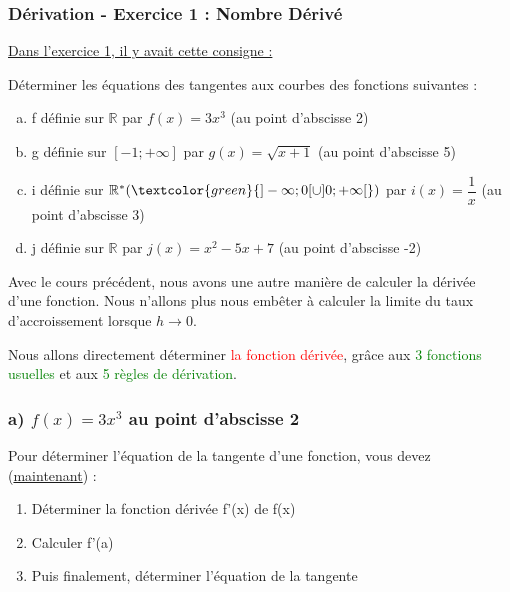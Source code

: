 \documentclass[t]{beamer}
\begin{document}
	\begin{frame}[label=pagebanale]
		\frametitle{Dérivation - Exercice 1 : Nombre Dérivé}
		\pause
		\underline{Dans l'exercice 1, il y avait cette consigne :}

		\pause
		Déterminer les équations des tangentes aux courbes des fonctions suivantes :
		\pause
		\begin{enumerate}[a)]
			\item<+-> f définie sur $\mathbb{R}$ par $f(x) = 3x^3$ (au point d'abscisse 2)
			\item<+-> g définie sur $[-1;+\infty ]$ par $g(x) = \sqrt{x+1}$ (au point d'abscisse 5)
			\item<+-> i définie sur $\mathbb{R}^* (\textcolor{green}{]-\infty;0[\cup]0;+\infty[})$ par $i(x) = \dfrac{1}{x}$ (au point d'abscisse 3)
			\item<+-> j définie sur $\mathbb{R}$ par $j(x) = x^2 - 5x +7$ (au point d'abscisse -2)
		\end{enumerate}
		\pause
		Avec le cours précédent, \pause nous avons une autre manière de calculer la dérivée d'une fonction. \pause Nous n'allons plus nous embêter à calculer la limite du taux d'accroissement lorsque $h \rightarrow 0$.

		\pause Nous allons directement déterminer \textcolor{red}{la fonction dérivée}, \pause grâce aux \textcolor{green}{3 fonctions usuelles} \pause et aux \textcolor{green}{5 règles de dérivation}. 
	\end{frame}

	\begin{frame}
		\frametitle{a) $f(x) = 3x^3$ au point d'abscisse 2}
		\pause
		\begin{block}{}
			Pour déterminer l'équation de la tangente d'une fonction, vous devez (\underline{maintenant}) :
			\pause
			\begin{enumerate}[1.]
				\item Déterminer la fonction dérivée f'(x) de f(x)
				\pause
				\item Calculer f'(a)
				\pause
				\item Puis finalement, déterminer l'équation de la tangente
			\end{enumerate}
		\end{block}
	\end{frame}
\end{document}
